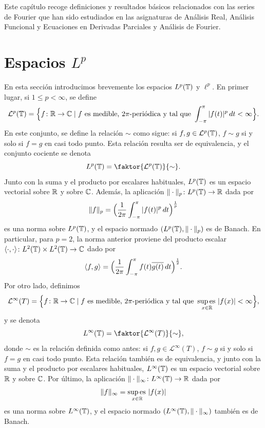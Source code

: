 \documentclass[a4paper, 12pt]{book}
\begin{document}
\setcounter{page}{1} 

Este capítulo recoge definiciones y resultados básicos relacionados con las series de Fourier que han sido estudiados en las asignaturas de Análisis Real, Análisis Funcional y Ecuaciones en Derivadas Parciales y Análisis de Fourier.

\section[Espacios \texorpdfstring{$L^p$}{Lp}]{Espacios \texorpdfstring{\boldmath$L^p$}{Lp}}

En esta sección introducimos brevemente los espacios $L^p(\mathbb T)$ y $\ell^p$. En primer lugar, si $1 \leq p < \infty$, se define
\[\mathcal{L}^p(\mathbb T) = \Bigl\{f \colon \mathbb R \to \mathbb C \mid f \textup{ es medible, } 2\pi\textup{-periódica y tal que } \int_{-\pi}^{\pi} |f(t)|^p \, dt < \infty \Bigr\}.\]
En este conjunto, se define la relación $\sim$ como sigue: si $f,g \in \mathcal{L}^p(\mathbb T)$, $f \sim g$ si y solo si $f = g$ en casi todo punto. Esta relación resulta ser de equivalencia, y el conjunto cociente se denota
\[L^p(\T) = \faktor{\mathcal{L}^p(\T)}{\sim}.\]
Junto con la suma y el producto por escalares habituales, $L^p(\mathbb T)$ es un espacio vectorial sobre $\mathbb R$ y sobre $\mathbb C$. Además, la aplicación $\|\cdot\|_p \colon L^p(\mathbb T) \to \mathbb R$ dada por
\[\|f\|_{p} = \Bigl(\frac{1}{2\pi}\int_{-\pi}^{\pi} |f(t)|^p \, dt\Bigr)^{\frac{1}{p}}\]
es una norma sobre $L^p(\mathbb T)$, y el espacio normado $(L^p(\mathbb T),\|\cdot\|_p)$ es de Banach. En particular, para $p=2$, la norma anterior proviene del producto escalar $\langle \cdot,\cdot\rangle \colon L^2(\mathbb T)\times L^2(\mathbb T)\to \mathbb C$ dado por
\[\langle f,g\rangle = \Bigl(\frac{1}{2\pi}\int_{-\pi}^{\pi} f(t)\overline{g(t)} \, dt\Bigr)^{\frac{1}{2}}.\]
Por otro lado, definimos
\[\mathcal{L}^\infty(T) = \Bigl\{f \colon \mathbb R \to \mathbb C \mid f \textup{ es medible, } 2\pi\textup{-periódica y tal que } \operatorname*{sup\,es\,}_{x \in \mathbb R} |f(x)| < \infty\Bigr\},\]
y se denota
\[L^\infty(\T) = \faktor{\mathcal{L}^\infty(T)}{\sim},\]
donde $\sim$ es la relación definida como antes: si $f,g \in \mathcal{L}^\infty(T)$, $f \sim g$ si y solo si $f=g$ en casi todo punto. Esta relación también es de equivalencia, y junto con la suma y el producto por escalares habituales, $L^\infty(\mathbb T)$ es un espacio vectorial sobre $\mathbb R$ y sobre $\mathbb C$. Por último, la aplicación $\|\cdot\|_\infty \colon L^\infty(\mathbb T) \to \mathbb R$ dada por
\[\|f\|_{\infty} = \operatorname*{sup\,es\,}_{x \in \mathbb R} |f(x)|\]
es una norma sobre $L^\infty(\mathbb T)$, y el espacio normado $(L^\infty(\mathbb T),\|\cdot\|_\infty)$ también es de Banach.
\end{document}
